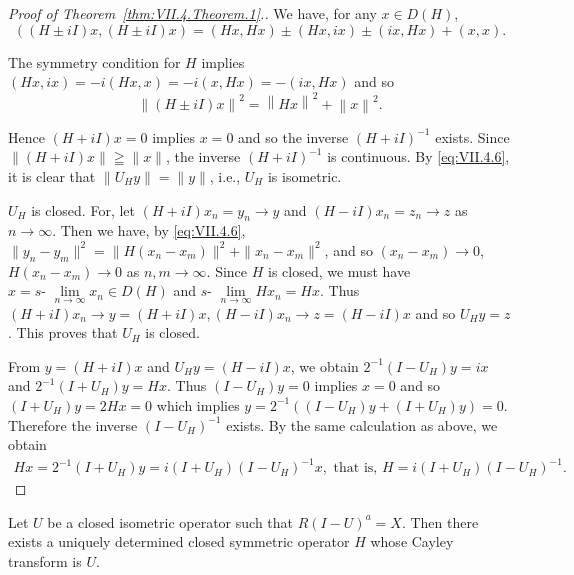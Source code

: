 \begin{proof}[Proof of Theorem~\ref{thm:VII.4.Theorem.1}.]
We have, for any $x \in D(H)$,
\[
((H \pm i I) x, (H \pm i I) x) = (H x, H x) \pm (H x, i x) \pm (i x, H x) + (x, x).
\]

The symmetry condition for $H$ implies $(Hx, ix) = -i(Hx, x) = -i(x, Hx) = -(ix, Hx)$ and so 
\begin{equation}\label{eq:VII.4.6}
\left\| (H \pm i I) x \right\| ^{2} = \left\| H x \right\| ^{2} + \left\| x \right\| ^{2}.
\end{equation}

Hence $(H + iI)x = 0$ implies $x = 0$ and so the inverse $(H + iI)^{-1}$ exists. Since $\|(H + iI)x\| \geqq \|x\|$, the inverse $(H + iI)^{-1}$ is continuous. By \eqref{eq:VII.4.6}, it is clear that $\|U_Hy\| = \|y\|$, i.e., $U_H$ is isometric. 

$U_{H}$ is closed. For, let $(H + iI)x_{n} = y_{n}\rightarrow y$ and $(H - iI)x_{n} = z_{n}\rightarrow z$ as $n\to \infty$. Then we have, by \eqref{eq:VII.4.6}, $\| y_n - y_m\|^2 = \| H(x_n - x_m)\|^2 +\| x_n - x_m\|^2$, and so $(x_{n} - x_{m})\to 0$, $H(x_{n} - x_{m})\to 0$ as $n,m\to \infty$. Since $H$ is closed, we must have $x = s\text{- }\lim\limits_{n\to \infty}x_n\in D(H)$ and $s\text{- }\lim\limits_{n\to \infty}Hx_n = Hx$. Thus $(H + iI)x_{n}\to y = (H + iI)x,(H - iI)x_{n}\to z = (H - iI)x$ and so $U_Hy = z$. This proves that $U_{H}$ is closed. 

From $y = (H + iI)x$ and $U_Hy = (H - iI)x$, we obtain $2^{-1}(I - U_H)y = ix$ and $2^{-1}(I + U_H)y = Hx$. Thus $(I - U_H)y = 0$ implies $x = 0$ and so $(I + U_H)y = 2Hx = 0$ which implies $y = 2^{-1}((I - U_H)y + (I + U_H)y) = 0$. Therefore the inverse $(I - U_H)^{-1}$ exists. By the same calculation as above, we obtain 
\[
\begin{gathered}
H x = 2 ^{-1} (I + U _{H}) y = i (I + U _{H}) (I - U _{H}) ^{-1} x, \text{ that is, } H = i (I + U _{H}) (I - U _{H}) ^{-1}.
\end{gathered}
\]
\end{proof}

\begin{theorem}\label{thm:VII.4.Theorem.2} Let $U$ be a closed isometric operator such that $R(I - U)^{a} = X$. Then there exists a uniquely determined closed symmetric operator $H$ whose Cayley transform is $U$. 
\end{theorem}

